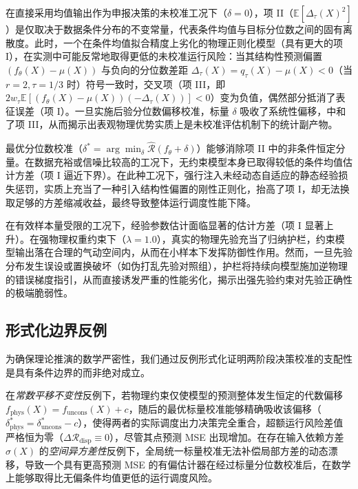 \begin{remark}
\label{rem:masking}
在直接采用均值输出作为申报决策的未校准工况下（$\delta=0$），项 II（$\mathbb{E}[\Delta_\tau(X)^2]$）是仅取决于数据条件分布的不变常量，代表条件均值与目标分位数之间的固有离散度。此时，一个在条件均值拟合精度上劣化的物理正则化模型（具有更大的项 I），在实测中可能反常地取得更低的未校准运行风险：当其结构性预测偏置 $(f_\theta(X) - \mu(X))$ 与负向的分位数差距 $\Delta_\tau(X) = q_\tau(X) - \mu(X) < 0$（当 $r=2, \tau=1/3$ 时）符号一致时，交叉项（项 III，即 $2 w_\tau \mathbb{E}[(f_\theta(X) - \mu(X))(-\Delta_\tau(X))] < 0$）变为负值，偶然部分抵消了表征误差（项 I）。一旦实施后验分位数偏移校准，标量 $\delta$ 吸收了系统性偏移，中和了项 III，从而揭示出表观物理优势实质上是未校准评估机制下的统计副产物。
\end{remark}

\begin{remark}
\label{rem:exposure}
最优分位数校准（$\delta^* = \arg\min_\delta \hat{\mathcal{R}}(f_\theta + \delta)$）能够消除项 II 中的非条件恒定分量。在数据充裕或信噪比较高的工况下，无约束模型本身已取得较低的条件均值估计方差（项 I 逼近下界）。在此种工况下，强行注入未经动态自适应的静态经验损失惩罚，实质上充当了一种引入结构性偏置的刚性正则化，抬高了项 I，却无法换取足够的方差缩减收益，最终导致整体运行调度性能下降。
\end{remark}

\begin{remark}
\label{rem:inductive_guardrails}
在有效样本量受限的工况下，经验参数估计面临显著的估计方差（项 I 显著上升）。在强物理权重约束下（$\lambda=1.0$），真实的物理先验充当了归纳护栏，约束模型输出落在合理的气动空间内，从而在小样本下发挥防御性作用。然而，一旦先验分布发生误设或置换破坏（如伪打乱先验对照组），护栏将持续向模型施加逆物理的错误梯度指引，从而直接诱发严重的性能劣化，揭示出强先验约束对先验正确性的极端脆弱性。
\end{remark}

\subsection{形式化边界反例}
为确保理论推演的数学严密性，我们通过反例形式化证明两阶段决策校准的支配性是具有条件边界的而非绝对成立。

在\textit{常数平移不变性}反例下，若物理约束仅使模型的预测整体发生恒定的代数偏移 $f_{\text{phys}}(X) = f_{\text{uncons}}(X) + c$，随后的最优标量校准能够精确吸收该偏移（$\delta_{\text{phys}}^* = \delta_{\text{uncons}}^* - c$），使得两者的实际调度出力决策完全重合，超额运行风险差值严格恒为零（$\Delta \mathcal{R}_{\text{disp}} \equiv 0$），尽管其点预测 MSE 出现增加。在存在输入依赖方差 $\sigma(X)$ 的\textit{空间异方差性}反例下，全局统一标量校准无法补偿局部方差的动态漂移，导致一个具有更高预测 MSE 的有偏估计器在经过标量分位数校准后，在数学上能够取得比无偏条件均值更低的运行调度风险。

